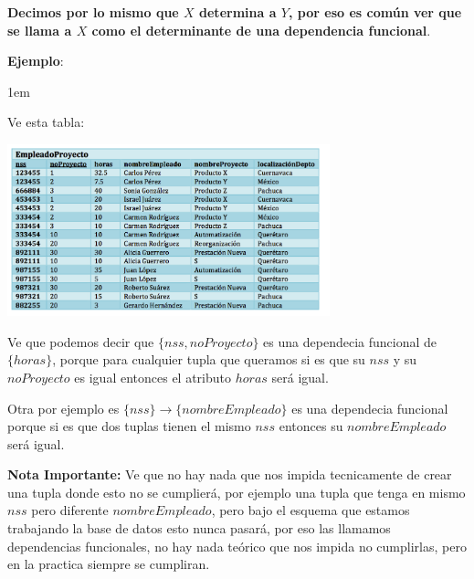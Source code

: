 \documentclass[12pt, fleqn]{report}                             %
\newenvironment{SmallIndentation}[1][0.75em]                    %
    {\begin{adjustwidth}{#1}{}\begin{footnotesize}}                 %
    {\end{footnotesize}\end{adjustwidth}}                           %
\begin{document}
                \textbf{Decimos por lo mismo que $X$ determina a $Y$, por eso es común ver que se llama
                a $X$ como el determinante de una dependencia funcional}.

                \vspace{2em}
                \textbf{Ejemplo}:
                \begin{SmallIndentation}[1em]

                    Ve esta tabla:

                    \includegraphics[width=0.70\textwidth]{EjemploTablaSinNormalizar}

                    Ve que podemos decir que $\{nss, noProyecto\}$ es una dependecia funcional
                    de $\{horas\}$, porque para cualquier tupla que queramos si es que su $nss$ y su
                    $noProyecto$ es igual entonces el atributo $horas$ será igual.

                    Otra por ejemplo es $\{nss\} \to \{nombreEmpleado\}$ es una dependecia funcional
                    porque si es que dos tuplas tienen el mismo $nss$ entonces su $nombreEmpleado$
                    será igual.

                    \textbf{Nota Importante:} Ve que no hay nada que nos impida tecnicamente de crear
                    una tupla donde esto no se cumplierá, por ejemplo una tupla que tenga en mismo
                    $nss$ pero diferente $nombreEmpleado$, pero bajo el esquema que estamos trabajando
                    la base de datos esto nunca pasará, por eso las llamamos dependencias funcionales,
                    no hay nada teórico que nos impida no cumplirlas, pero en la practica siempre
                    se cumpliran.

                \end{SmallIndentation}
                    
\end{document}
